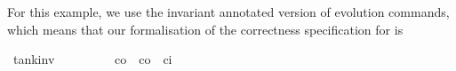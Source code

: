 \documentclass[envcountsame,envcountsect]{llncs}
\newcommand{\IF}[3]{\mathbf{if}\ #1\ \mathbf{then}\ #2\ \mathbf{else}\ #3}
\begin{document}
\begin{example}
\begin{isabellebody}
\end{isabellebody}
%
For this example, we use the invariant annotated version of evolution commands, which means that our formalisation of the correctness specification for  is
\begin{isabellebody}
\isanewline
{}\isamarkupfalse%
\ tank{\isacharunderscore}inv{\isacharcolon}\isanewline
\ \ \ {\isachardoublequoteopen}{}\ {\isasymle}\ {\isasymtau}{\isachardoublequoteclose}\ \ {\isachardoublequoteopen}{}\ {\isacharless}\ c\isactrlsub o{\isachardoublequoteclose}\ \ {\isachardoublequoteopen}c\isactrlsub o\ {\isacharless}\ c\isactrlsub i{\isachardoublequoteclose}\isanewline

\end{isabellebody}
\end{example}
\end{document}
